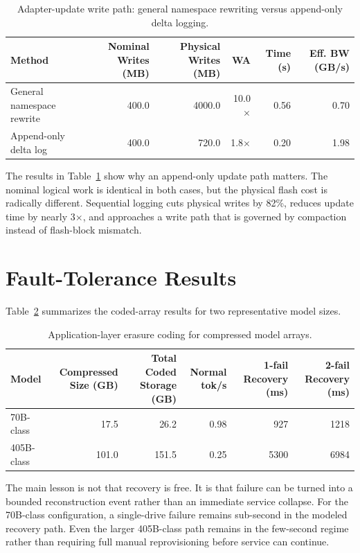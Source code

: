 \documentclass[11pt]{article}
\begin{document}
\begin{table}[t]
\centering
\caption{Adapter-update write path: general namespace rewriting versus append-only delta logging.}
\label{tab:lora}
\begin{tabular}{lrrrrr}
\toprule
Method & Nominal Writes (MB) & Physical Writes (MB) & WA & Time (s) & Eff. BW (GB/s) \\
\midrule
General namespace rewrite & 400.0 & 4000.0 & 10.0$\times$ & 0.56 & 0.70 \\
Append-only delta log & 400.0 & 720.0 & 1.8$\times$ & 0.20 & 1.98 \\
\bottomrule
\end{tabular}
\end{table}

The results in Table~\ref{tab:lora} show why an append-only update path matters. The nominal logical work is identical in both cases, but the physical flash cost is radically different. Sequential logging cuts physical writes by 82\%, reduces update time by nearly 3$\times$, and approaches a write path that is governed by compaction instead of flash-block mismatch.

\section{Fault-Tolerance Results}
Table~\ref{tab:ec} summarizes the coded-array results for two representative model sizes.

\begin{table}[t]
\centering
\caption{Application-layer erasure coding for compressed model arrays.}
\label{tab:ec}
\begin{tabular}{lrrrrr}
\toprule
Model & Compressed Size (GB) & Total Coded Storage (GB) & Normal tok/s & 1-fail Recovery (ms) & 2-fail Recovery (ms) \\
\midrule
70B-class & 17.5 & 26.2 & 0.98 & 927 & 1218 \\
405B-class & 101.0 & 151.5 & 0.25 & 5300 & 6984 \\
\bottomrule
\end{tabular}
\end{table}

The main lesson is not that recovery is free. It is that failure can be turned into a bounded reconstruction event rather than an immediate service collapse. For the 70B-class configuration, a single-drive failure remains sub-second in the modeled recovery path. Even the larger 405B-class path remains in the few-second regime rather than requiring full manual reprovisioning before service can continue.
\end{document}
